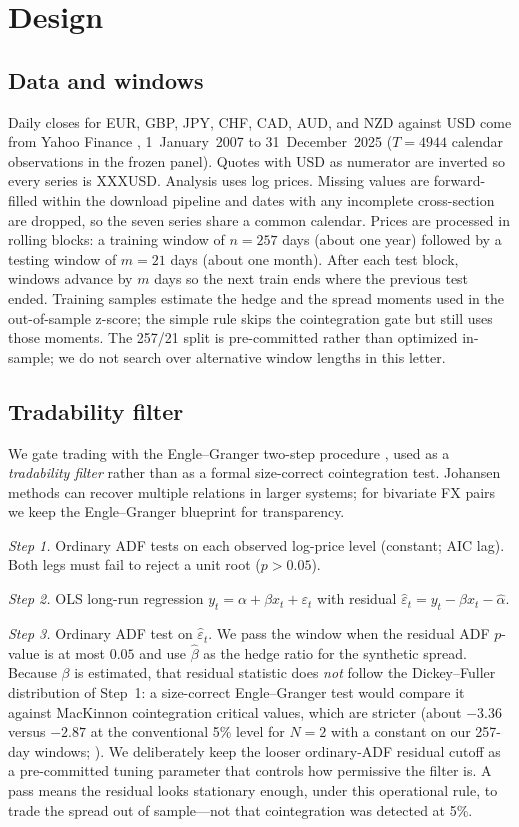 \documentclass[11pt,a4paper]{article}
\begin{document}
\section{Design}

\subsection{Data and windows}

Daily closes for EUR, GBP, JPY, CHF, CAD, AUD, and NZD against USD come from Yahoo Finance
\parencite{yahoo2024}, 1~January~2007 to 31~December~2025 ($T=4944$ calendar observations in
the frozen panel). Quotes with USD as numerator are inverted so every series is XXXUSD.
Analysis uses log prices. Missing values are forward-filled within the download pipeline and
dates with any incomplete cross-section are dropped, so the seven series share a common
calendar. Prices are processed in rolling blocks: a training window of $n=257$ days (about one
year) followed by a testing window of $m=21$ days (about one month). After each test block,
windows advance by $m$ days so the next train ends where the previous test ended. Training
samples estimate the hedge and the spread moments used in the out-of-sample z-score; the
simple rule skips the cointegration gate but still uses those moments. The 257/21 split is
pre-committed rather than optimized in-sample; we do not search over alternative window
lengths in this letter.

\subsection{Tradability filter}

We gate trading with the Engle--Granger two-step procedure \parencite{engle1987}, used as a
\emph{tradability filter} rather than as a formal size-correct cointegration test. Johansen
methods can recover multiple relations in larger systems; for bivariate FX pairs we keep the
Engle--Granger blueprint for transparency.

\emph{Step 1.} Ordinary ADF tests on each observed log-price level (constant; AIC lag). Both
legs must fail to reject a unit root ($p>0.05$).

\emph{Step 2.} OLS long-run regression $y_t=\alpha+\beta x_t+\varepsilon_t$ with residual
$\hat\varepsilon_t=y_t-\hat\beta x_t-\hat\alpha$.

\emph{Step 3.} Ordinary ADF test on $\hat\varepsilon_t$. We pass the window when the residual
ADF $p$-value is at most $0.05$ and use $\hat\beta$ as the hedge ratio for the synthetic
spread. Because $\beta$ is estimated, that residual statistic does \emph{not} follow the
Dickey--Fuller distribution of Step~1: a size-correct Engle--Granger test would compare it
against MacKinnon cointegration critical values, which are stricter (about $-3.36$ versus
$-2.87$ at the conventional 5\% level for $N=2$ with a constant on our 257-day windows;
\parencite{mackinnon1994,mackinnon2010}). We deliberately keep the looser ordinary-ADF residual
cutoff as a pre-committed tuning parameter that controls how permissive the filter is. A pass
means the residual looks stationary enough, under this operational rule, to trade the spread
out of sample---not that cointegration was detected at 5\%.
\end{document}
